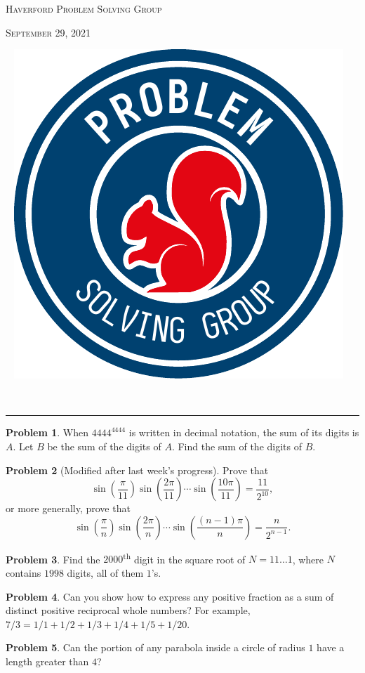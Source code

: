 \documentclass{scrartcl}
\theoremstyle{definition}
\newtheorem{prob}{Problem}
\begin{document}
	\begin{minipage}{.6\textwidth}{}
		\textsc{Haverford Problem Solving Group}

		\textsc{September 29, 2021}
	\end{minipage}
	\begin{minipage}{.4\textwidth}{}
		\ \hfill
		\includegraphics[height = .9in]{psg_logo}
	\end{minipage}\\[1em]

	\hrule

	\begin{prob}
		When \(4444^{4444}\) is written in decimal notation, the sum of its digits is \(A\).  Let \(B\) be the sum of the digits of \(A\). Find the sum of the digits of \(B\).
	\end{prob}

	\begin{prob}[Modified after last week's progress]
		Prove that \[ \sin\left(\frac{\pi}{11}\right) \sin\left(\frac{2\pi}{11}\right) \cdots \sin\left(\frac{10\pi}{11}\right) = \frac{11}{2^{10}},\]
		or more generally, prove that \[ \sin\left(\frac{\pi}{n}\right) \sin\left(\frac{2\pi}{n}\right) \cdots \sin\left(\frac{(n-1)\pi}{n}\right) = \frac{n}{2^{n-1}}.\]
	\end{prob}

	\begin{prob}
		Find the $2000$\textsuperscript{th} digit in the square root of $N = 11\dots1$, where $N$ contains $1998$ digits, all of them $1$'s.
	\end{prob}

	\setcounter{prob}{4}

	\begin{prob}
		Can you show how to express any positive fraction as a sum of distinct positive reciprocal whole numbers? For example, $7/3 = 1/1 + 1/2 + 1/3 + 1/4 + 1/5 + 1/20$.
	\end{prob}

	\begin{prob}
		Can the portion of any parabola inside a circle of radius \(1\) have a length greater than \(4\)?
	\end{prob}
\end{document}
